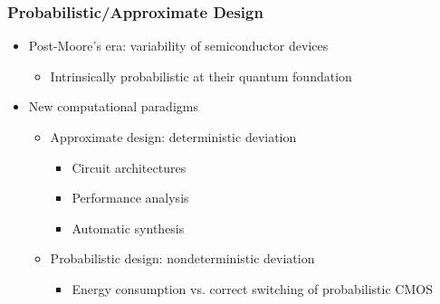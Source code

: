 \begin{frame}
      \frametitle{Probabilistic/Approximate Design}
      \begin{itemize}
            \item Post-Moore's era: variability of semiconductor devices
                  \begin{itemize}
                        \item Intrinsically probabilistic at their quantum foundation
                  \end{itemize}
                  \pause
            \item New computational paradigms
                  \begin{itemize}
                        \item Approximate design: deterministic deviation
                              \begin{itemize}
                                    \item Circuit architectures~\cite{Kahng2012,Ye2013,Kim2013}
                                    \item Performance analysis~\cite{Li2014,Venkatesan2011ApproxDesign}
                                    \item Automatic synthesis~\cite{Miao2013,Miao2014,Mrazek2016,Rehman2016,Venkataramani2012}
                              \end{itemize}
                        \item Probabilistic design: nondeterministic deviation
                              \begin{itemize}
                                    \item Energy consumption vs. correct switching of probabilistic CMOS~\cite{Chakrapani2006ProbDesign}
                              \end{itemize}
                  \end{itemize}
      \end{itemize}
\end{frame}


